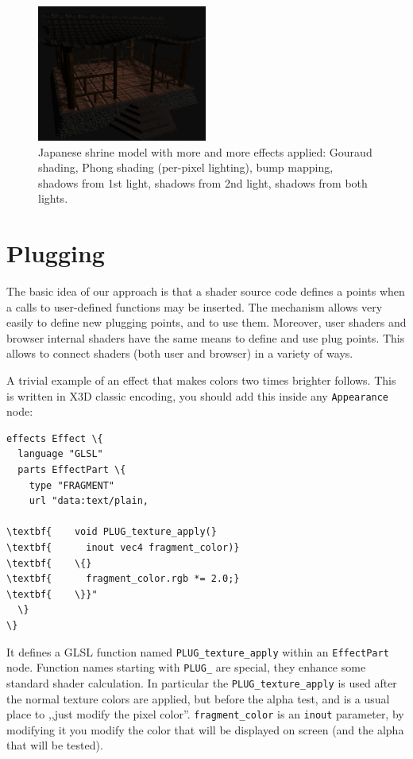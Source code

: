 \documentclass{acmsiggraph}                     %
\begin{document}
\begin{figure}[t]
  \includegraphics[width=2.2in]{rhan_shrine_5_everything}
  \caption{Japanese shrine model with more and more effects applied: Gouraud shading,
Phong shading (per-pixel lighting), bump mapping, shadows from 1st light,
shadows from 2nd light, shadows from both lights.}
\end{figure}

\section{Plugging}

The basic idea of our approach is that a shader source code defines
a points when a calls to user-defined functions may be inserted. The mechanism
allows very easily to define new plugging points, and to use
them. Moreover, user shaders and browser internal shaders have the
same means to define and use plug points. This allows to connect
shaders (both user and browser) in a variety of ways.

A trivial example of an effect that makes colors two times brighter
follows. This is written in X3D classic encoding,
you should add this inside any \texttt{Appearance} node:

\begin{Verbatim}[commandchars=\\\{\},frame=single]
effects Effect \{
  language "GLSL"
  parts EffectPart \{
    type "FRAGMENT"
    url "data:text/plain,

\textbf{    void PLUG_texture_apply(}
\textbf{      inout vec4 fragment_color)}
\textbf{    \{}
\textbf{      fragment_color.rgb *= 2.0;}
\textbf{    \}}"
  \}
\}
\end{Verbatim}

It defines a GLSL function named \texttt{PLUG\_texture\_apply}
within an \texttt{EffectPart} node. Function names starting with \texttt{PLUG\_}
are special, they enhance some standard shader calculation. In particular
the \texttt{PLUG\_texture\_apply} is used after the normal texture colors are applied,
but before the alpha test, and is a usual place to ,,just modify the pixel color''.
\texttt{fragment\_color} is an \texttt{inout} parameter, by modifying it
you modify the color that will be displayed on screen (and the alpha that will
be tested).
\end{document}
